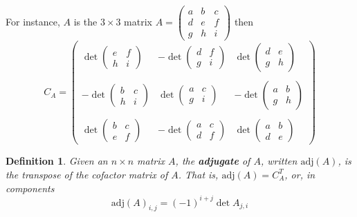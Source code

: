 \documentclass[12pt]{article}
\numberwithin{equation}{subsection}
\numberwithin{figure}{subsection}
\newtheorem{defn}[subsection]{Definition}
\theoremstyle{note}
\newcommand\adj[1]{\mathrm{adj}(#1)}
\begin{document}
For instance, $A$ is the $3\times 3$ matrix $A=\begin{pmatrix} a & b & c \\ d & e & f \\ g & h & i\end{pmatrix}$ then 
\[C_A=\begin{pmatrix} 
	\det \begin{pmatrix} e & f \\ h & i \end{pmatrix} & -\det \begin{pmatrix} d & f \\ g & i \end{pmatrix} & \det \begin{pmatrix} d & e \\ g & h \end{pmatrix} \\
	&&\\
	-\det \begin{pmatrix} b & c \\ h & i \end{pmatrix} & \det \begin{pmatrix} a & c \\ g & i \end{pmatrix} & -\det \begin{pmatrix} a & b \\ g & h \end{pmatrix}\\
	&&\\
	\det \begin{pmatrix} b & c \\ e & f \end{pmatrix} & -\det \begin{pmatrix} a & c \\ d & f \end{pmatrix} & \det \begin{pmatrix} a & b \\ d & e \end{pmatrix}
\end{pmatrix}\]
\begin{defn}Given an $n\times n$ matrix $A$, the \textbf{adjugate} of $A$, written $\adj{A}$, is the transpose of the cofactor matrix of $A$. That is, $\adj{A}=C_A^T$, or, in components \begin{equation} \adj{A}_{i,j}=(-1)^{i+j} \det{A_{j,i}}\end{equation}
\end{defn}
\end{document}
